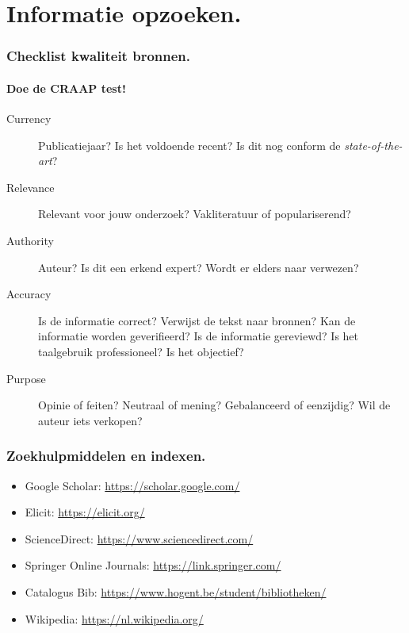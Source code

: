 \documentclass[aspectratio=169]{beamer}
\begin{document}
\section{Informatie opzoeken.}

\begin{frame}
  \frametitle{Checklist kwaliteit bronnen.}
  \framesubtitle{Doe de CRAAP test!}

  \begin{description}
    \item[Currency] Publicatiejaar? Is het voldoende recent? Is dit nog conform de \emph{state-of-the-art}?
    \item[Relevance] Relevant voor jouw onderzoek? Vakliteratuur of populariserend?
    \item[Authority] Auteur? Is dit een erkend expert? Wordt er elders naar verwezen?
    \item[Accuracy] Is de informatie correct? Verwijst de tekst naar bronnen? Kan de informatie worden geverifieerd? Is de informatie gereviewd? Is het taalgebruik professioneel? Is het objectief?
    \item[Purpose] Opinie of feiten? Neutraal of mening? Gebalanceerd of eenzijdig? Wil de auteur iets verkopen?
  \end{description}

\end{frame}

\begin{frame}
  \frametitle{Zoekhulpmiddelen en indexen.}

  \begin{itemize}
    \item Google Scholar: \url{https://scholar.google.com/}
    \item Elicit: \url{https://elicit.org/}
    \item ScienceDirect: \url{https://www.sciencedirect.com/}
    \item Springer Online Journals: \url{https://link.springer.com/}
    \item Catalogus Bib: \url{https://www.hogent.be/student/bibliotheken/}
    \item Wikipedia: \url{https://nl.wikipedia.org/}
  \end{itemize}
\end{frame}
\end{document}
